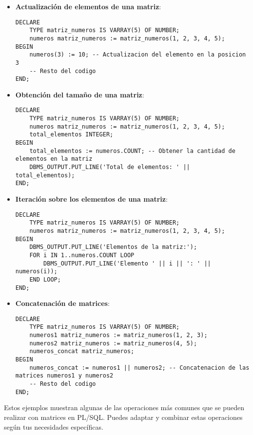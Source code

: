 \documentclass[executivepaper]{article}
\begin{document}
\begin{itemize}
   \item \textbf{Actualización de elementos de una matriz}:

\begin{lstlisting}
DECLARE
    TYPE matriz_numeros IS VARRAY(5) OF NUMBER;
    numeros matriz_numeros := matriz_numeros(1, 2, 3, 4, 5);
BEGIN
    numeros(3) := 10; -- Actualizacion del elemento en la posicion 3
    -- Resto del codigo
END;
\end{lstlisting}

   \item \textbf{Obtención del tamaño de una matriz}:

\begin{lstlisting}
DECLARE
    TYPE matriz_numeros IS VARRAY(5) OF NUMBER;
    numeros matriz_numeros := matriz_numeros(1, 2, 3, 4, 5);
    total_elementos INTEGER;
BEGIN
    total_elementos := numeros.COUNT; -- Obtener la cantidad de elementos en la matriz
    DBMS_OUTPUT.PUT_LINE('Total de elementos: ' || total_elementos);
END;
\end{lstlisting}

   \item \textbf{Iteración sobre los elementos de una matriz}:

\begin{lstlisting}
DECLARE
    TYPE matriz_numeros IS VARRAY(5) OF NUMBER;
    numeros matriz_numeros := matriz_numeros(1, 2, 3, 4, 5);
BEGIN
    DBMS_OUTPUT.PUT_LINE('Elementos de la matriz:');
    FOR i IN 1..numeros.COUNT LOOP
        DBMS_OUTPUT.PUT_LINE('Elemento ' || i || ': ' || numeros(i));
    END LOOP;
END;
\end{lstlisting}

   \item \textbf{Concatenación de matrices}:

\begin{lstlisting}
DECLARE
    TYPE matriz_numeros IS VARRAY(5) OF NUMBER;
    numeros1 matriz_numeros := matriz_numeros(1, 2, 3);
    numeros2 matriz_numeros := matriz_numeros(4, 5);
    numeros_concat matriz_numeros;
BEGIN
    numeros_concat := numeros1 || numeros2; -- Concatenacion de las matrices numeros1 y numeros2
    -- Resto del codigo
END;
\end{lstlisting}

\end{itemize}

Estos ejemplos muestran algunas de las operaciones más comunes que se pueden realizar con matrices en PL/SQL. Puedes adaptar y combinar estas operaciones según tus necesidades específicas.
\end{document}
